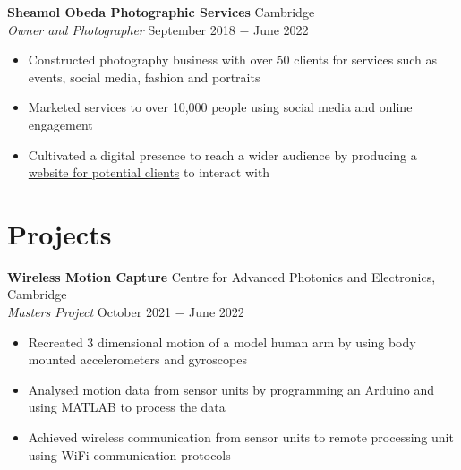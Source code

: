 \documentclass{article}
\begin{document}
\textbf{Sheamol Obeda Photographic Services} \hfill Cambridge\\
\textit{Owner and Photographer} \hfill September 2018 $-$ June 2022
\begin{itemize}
    \item Constructed photography business with over 50 clients for services such as events, social media, fashion and portraits
    \item Marketed services to over 10,000 people using social media and online engagement
    \item Cultivated a digital presence to reach a wider audience by producing a \href{www.sheamol.com}{website for potential clients} to interact with 
\end{itemize} \medskip


\vspace{-0.75\baselineskip}
\hrulefill
\vspace{-0.75\baselineskip}

\section*{Projects}

\textbf{Wireless Motion Capture} \hfill Centre for Advanced Photonics and Electronics, Cambridge\\
\textit{Masters Project} \hfill October 2021 $-$ June 2022
\begin{itemize}
    \item Recreated 3 dimensional motion of a model human arm by using body mounted accelerometers and gyroscopes
    \item Analysed motion data from sensor units by programming an Arduino and using MATLAB to process the data
    \item Achieved wireless communication from sensor units to remote processing unit using WiFi communication protocols
\end{itemize} \medskip
\end{document}
